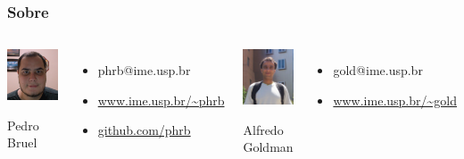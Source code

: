 \documentclass[10pt, compress]{beamer}
\begin{document}
\begin{frame}
    \frametitle{Sobre}
    \begin{columns}[T,onlytextwidth]
        \begin{center}
            \includegraphics[width=.45\textwidth]{pedro}

            Pedro Bruel
        \end{center}

        \begin{itemize}
            \item \alert{phrb}@ime.usp.br
            \item \url{www.ime.usp.br/~phrb}
            \item \url{github.com/phrb}
        \end{itemize}

        \begin{center}
            \includegraphics[width=.4\textwidth]{alfredo}

            Alfredo Goldman
        \end{center}

        \begin{itemize}
            \item \alert{gold}@ime.usp.br
            \item \url{www.ime.usp.br/~gold}
        \end{itemize}
    \end{columns}
\end{frame}
\end{document}
